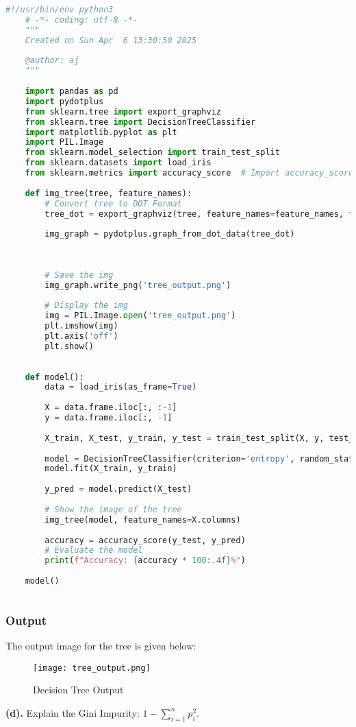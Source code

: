 \documentclass[12pt,letterpaper]{article}
\begin{document}
\begin{lstlisting}[language=Python, breaklines=true, columns=flexible, frame=single]
    #!/usr/bin/env python3
    # -*- coding: utf-8 -*-
    """
    Created on Sun Apr  6 13:30:50 2025
    
    @author: aj
    """
    
    import pandas as pd
    import pydotplus
    from sklearn.tree import export_graphviz
    from sklearn.tree import DecisionTreeClassifier
    import matplotlib.pyplot as plt
    import PIL.Image
    from sklearn.model_selection import train_test_split
    from sklearn.datasets import load_iris
    from sklearn.metrics import accuracy_score  # Import accuracy_score
    
    def img_tree(tree, feature_names):
        # Convert tree to DOT Format
        tree_dot = export_graphviz(tree, feature_names=feature_names, filled=True, out_file=None)
    
        img_graph = pydotplus.graph_from_dot_data(tree_dot)
        
    
    
        # Save the img
        img_graph.write_png('tree_output.png')
    
        # Display the img
        img = PIL.Image.open('tree_output.png')
        plt.imshow(img)
        plt.axis('off')
        plt.show()
    
    
    def model():
        data = load_iris(as_frame=True)
    
        X = data.frame.iloc[:, :-1]
        y = data.frame.iloc[:, -1]
    
        X_train, X_test, y_train, y_test = train_test_split(X, y, test_size=0.2, random_state=42)
    
        model = DecisionTreeClassifier(criterion='entropy', random_state=42)
        model.fit(X_train, y_train)
    
        y_pred = model.predict(X_test)
    
        # Show the image of the tree
        img_tree(model, feature_names=X.columns)  
    
        accuracy = accuracy_score(y_test, y_pred)  
        # Evaluate the model
        print(f"Accuracy: {accuracy * 100:.4f}%")
    
    model()
    
\end{lstlisting}
\subsubsection*{Output}
The output image for the tree is given below:
\begin{figure}[H]
    \centering
    \texttt{[image: tree\_output.png]}
    \caption{Decision Tree Output}
    \label{Fig:1}
\end{figure}
\pagebreak
\textbf{(d).} Explain the Gini Impurity: \(1 - \sum_{i=1}^{n} p_{i}^{2}\).
\end{document}
